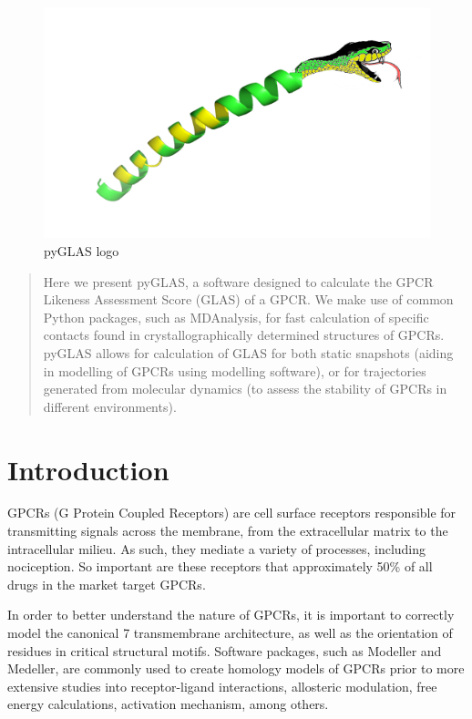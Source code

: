 \documentclass[12pt]{article}
\begin{document}
\maketitle

\begin{figure}[!h]
	\centering
	\includegraphics[scale=0.2]{pyGLASLogov1.png}
	\caption{pyGLAS logo}
\end{figure}

\begin{abstract}
Here we present pyGLAS, a software designed to calculate the GPCR Likeness Assessment Score (GLAS) of a GPCR. We make use of common Python packages, such as MDAnalysis, for fast calculation of specific contacts found in  crystallographically determined structures of GPCRs. pyGLAS allows for calculation of GLAS for both static snapshots (aiding in modelling of GPCRs using modelling software), or for trajectories generated from molecular dynamics (to assess the stability of GPCRs in different environments).
\end{abstract}

\newpage

\section{Introduction}
GPCRs (G Protein Coupled Receptors) are cell surface receptors responsible for transmitting signals across the membrane, from the extracellular matrix to the intracellular milieu. As such, they mediate a variety of processes, including nociception\cite{Fenalti2014}. So important are these receptors that approximately 50\% of all drugs in the market target GPCRs\cite{Cvicek2016}.

In order to better understand the nature of GPCRs, it is important to correctly model the canonical 7 transmembrane architecture, as well as the orientation of residues in critical structural motifs. Software packages, such as Modeller\cite{Sali1993} and Medeller\cite{Ebejer2013}, are commonly used to create homology models of GPCRs prior to more extensive studies into receptor-ligand interactions, allosteric modulation, free energy calculations, activation mechanism, among others.
\end{document}
